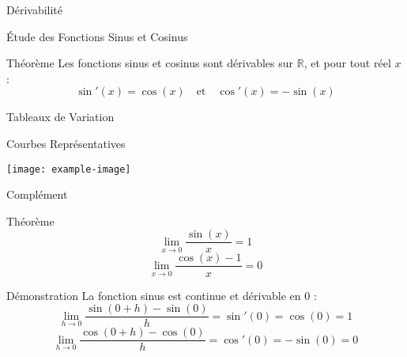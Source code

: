 \documentclass{cours}
\begin{document}
    \begin{Gpartie}{Dérivabilité} 
        \begin{Spartie}{Étude des Fonctions Sinus et Cosinus} 
            \begin{SSpartie}{Théorème} 
                Les fonctions sinus et cosinus sont dérivables sur $\mathbb{R}$, et pour tout réel $x$ : \[\sin'(x)=\cos(x)\quad\text{et}\quad\cos'(x)=-\sin(x)\]
            \end{SSpartie}
            \begin{SSpartie}{Tableaux de Variation} 
                \begin{center}
                    \parbox{\linewidth}{}
                \end{center}
            \end{SSpartie}
            \begin{SSpartie}{Courbes Représentatives} 
                \begin{center}
                        \texttt{[image: example-image]}
                    \parbox{\linewidth}{}
                \end{center}
            \end{SSpartie}
        \end{Spartie}
        \begin{Spartie}{Complément} 
            \begin{SSpartie}{Théorème} 
                \[\lim\limits_{x\to0}\frac{\sin(x)}{x}=1\] \[\lim\limits_{x\to0}\frac{\cos(x)-1}{x}=0\]
                \begin{SSSpartie}{Démonstration} 
                    La fonction sinus est continue et dérivable en $0$ : \[\lim\limits_{h\to0}\frac{\sin(0+h)-\sin(0)}{h}=\sin'(0)=\cos(0)=1\] \[\lim\limits_{h\to0}\frac{\cos(0+h)-\cos(0)}{h}=\cos'(0)=-\sin(0)=0\]
                \end{SSSpartie}
            \end{SSpartie}
        \end{Spartie}
    \end{Gpartie}
\end{document}
